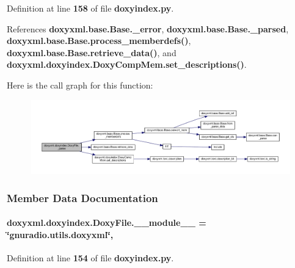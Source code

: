 Definition at line {\bf 158} of file {\bf doxyindex.\+py}.



References {\bf doxyxml.\+base.\+Base.\+\_\+error}, {\bf doxyxml.\+base.\+Base.\+\_\+parsed}, {\bf doxyxml.\+base.\+Base.\+process\+\_\+memberdefs()}, {\bf doxyxml.\+base.\+Base.\+retrieve\+\_\+data()}, and {\bf doxyxml.\+doxyindex.\+Doxy\+Comp\+Mem.\+set\+\_\+descriptions()}.



Here is the call graph for this function\+:
\nopagebreak
\begin{figure}[H]
\begin{center}
\leavevmode
\includegraphics[width=350pt]{d8/d7e/classdoxyxml_1_1doxyindex_1_1DoxyFile_a5b5b5e1207efb3f3865daa75afab1e4e_cgraph}
\end{center}
\end{figure}




\subsubsection{Member Data Documentation}
\paragraph[{\+\_\+\+\_\+module\+\_\+\+\_\+}]{ doxyxml.\+doxyindex.\+Doxy\+File.\+\_\+\+\_\+module\+\_\+\+\_\+ = \char`\"{}gnuradio.\+utils.\+doxyxml\char`\"{}\hspace{0.3cm}{\ttfamily [static]}, {\ttfamily [private]}}\label{classdoxyxml_1_1doxyindex_1_1DoxyFile_a8ae798e7f9ae92429edc4f2e85b6a0e6}


Definition at line {\bf 154} of file {\bf doxyindex.\+py}.

